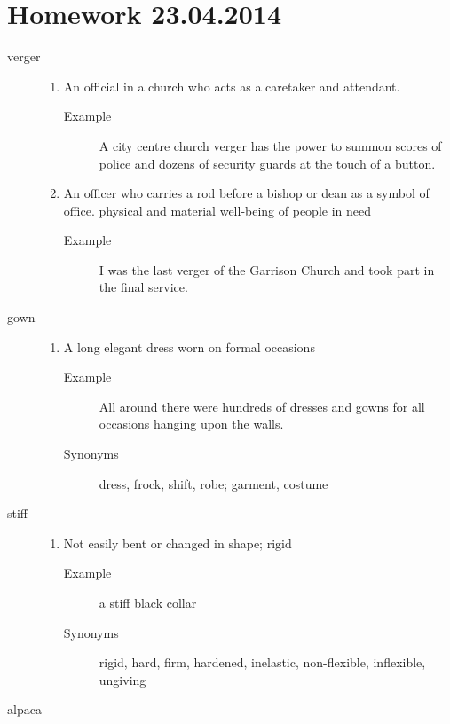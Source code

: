 \documentclass[12pt]{article}
\begin{document}
\section{Homework 23.04.2014}
\begin{description}
\item[verger]
	\begin{enumerate}
	\item An official in a church who acts as a caretaker and attendant.
		\begin{description}
		\item[Example] A city centre church verger has the power to summon scores of police and dozens of security guards at the touch of a button.
		\end{description}
	\item An officer who carries a rod before a bishop or dean as a symbol of office. physical and material well-being of people in need
		\begin{description}
		\item[Example] I was the last verger of the Garrison Church and took part in the final service.
		\end{description}
	\end{enumerate}
\item[gown]
	\begin{enumerate}
	\item A long elegant dress worn on formal occasions
		\begin{description}
		\item[Example] All around there were hundreds of dresses and gowns for all occasions hanging upon the walls.
		\item[Synonyms] dress, frock, shift, robe; garment, costume
		\end{description}
	\end{enumerate}
\item[stiff]
	\begin{enumerate}
	\item Not easily bent or changed in shape; rigid
		\begin{description}
		\item[Example] a stiff black collar
		\item[Synonyms] rigid, hard, firm, hardened, inelastic, non-flexible, inflexible, ungiving
		\end{description}
	\end{enumerate}
\item[alpaca]
	\begin{enumerate}

\end{enumerate}
\end{description}
\end{document}
